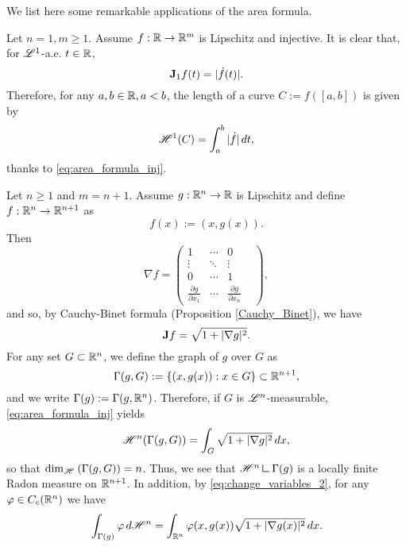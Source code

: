 We list here some remarkable applications of the area formula.

\begin{example}
Let $n = 1, m \ge 1$. Assume $f : \mathbb{R} \to \mathbb{R}^{m}$ is Lipschitz and injective. It is clear that, for $\mathscr{L}^{1}$-a.e. $t \in \mathbb{R}$,
\begin{equation*}
{\bf J}_{1} f(t) = |\dot{f}(t)|. 
\end{equation*}
Therefore, for any $a, b \in \mathbb{R}, a < b$, the length of a curve $C := f([a, b])$ is given by
\begin{equation*}
\mathscr{H}^{1}(C) = \int_{a}^{b} |\dot{f}| \, dt,
\end{equation*}
thanks to \eqref{eq:area_formula_inj}.
\end{example}

\begin{example}
Let $n \ge 1$ and $m = n + 1$. Assume $g: \mathbb{R}^{n} \to \mathbb{R}$ is Lipschitz and define $f: \mathbb{R}^{n} \to \mathbb{R}^{n + 1}$ as $$f(x) := (x, g(x)).$$
Then
\[\nabla f = \begin{pmatrix} 1 & \cdots & 0 & \\ \vdots & \ddots & \vdots \\ 
0 & \cdots & 1 & \\ \frac{\partial g}{\partial x_{1}} & \cdots & \frac{\partial g}{\partial x_{n}} & \end{pmatrix},\]
and so, by Cauchy-Binet formula (Proposition \ref{Cauchy_Binet}), we have
\begin{equation*}
{\bf J} f = \sqrt{1 + |\nabla g|^2}.
\end{equation*}
For any set $G \subset \mathbb{R}^{n}$, we define the graph of $g$ over $G$ as
$$ \Gamma(g, G) := \{ (x, g(x)) : x \in G \} \subset \mathbb{R}^{n + 1},$$
and we write $\Gamma(g) := \Gamma(g, \mathbb{R}^{n})$.
Therefore, if $G$ is $\mathscr{L}^{n}$-measurable, \eqref{eq:area_formula_inj} yields
\begin{equation*}
\mathscr{H}^{n}(\Gamma(g, G)) = \int_{G} \sqrt{1 + |\nabla g|^{2}} \, dx,
\end{equation*}
so that ${\rm dim}_{\mathscr{H}^{}}\left ( \Gamma(g, G)\right ) = n$. Thus, we see that $\Haus{n} \res \Gamma(g)$ is a locally finite Radon measure on $\mathbb{R}^{n + 1}$. In addition, by \eqref{eq:change_variables_2}, for any $\varphi \in C_{c}(\mathbb{R}^{n})$ we have
\begin{equation*}
\int_{\Gamma(g)} \varphi \, d \mathscr{H}^{n} = \int_{\mathbb{R}^{n}} \varphi(x, g(x)) \sqrt{1 + |\nabla g(x)|^{2}} \, d x.
\end{equation*} 
\end{example}

